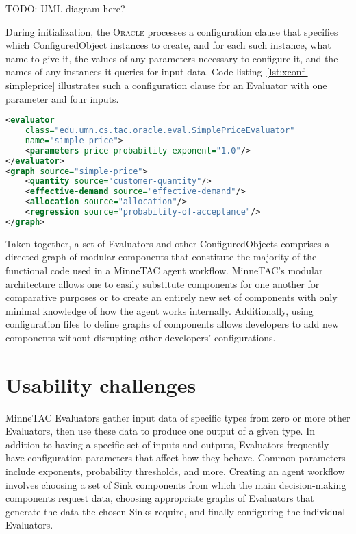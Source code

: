 \documentclass{article}
\begin{document}
TODO:  UML diagram here?

During initialization, the \textsc{Oracle} processes a configuration clause that specifies which ConfiguredObject instances to create, and for each such instance, what name to give it, the values of any parameters necessary to configure it, and the names of any instances it queries for input data.
Code listing~\ref{lst:xconf-simpleprice} illustrates such a configuration clause for an Evaluator with one parameter and four inputs.

{\small
\begin{lstlisting}[language={XML},frame={single},
label={lst:xconf-simpleprice},caption={Configuration clause for a price
evaluator that uses one parameter and several inputs}]
<evaluator
    class="edu.umn.cs.tac.oracle.eval.SimplePriceEvaluator"
    name="simple-price">
    <parameters price-probability-exponent="1.0"/>
</evaluator>
<graph source="simple-price">
    <quantity source="customer-quantity"/>
    <effective-demand source="effective-demand"/>
    <allocation source="allocation"/>
    <regression source="probability-of-acceptance"/>
</graph>
\end{lstlisting}
}

Taken together, a set of Evaluators and other ConfiguredObjects comprises a directed graph of modular components that constitute the majority of the functional code used in a MinneTAC agent workflow.
MinneTAC's modular architecture allows one to easily substitute components for one another for comparative purposes or to create an entirely new set of components with only minimal knowledge of how the agent works internally.
Additionally, using configuration files to define graphs of components allows developers to add new components without disrupting other developers' configurations.

\section{Usability challenges}
\label{sec:challenges}

MinneTAC Evaluators gather input data of specific types from zero or more other Evaluators, then use these data to produce one output of a given type.
In addition to having a specific set of inputs and outputs, Evaluators frequently have configuration parameters that affect how they behave.
Common parameters include exponents, probability thresholds, and more.
Creating an agent workflow involves choosing a set of Sink components from which the main decision-making components request data, choosing appropriate graphs of Evaluators that generate the data the chosen Sinks require, and finally configuring the individual Evaluators.~\cite{Collins08TR}
\end{document}
